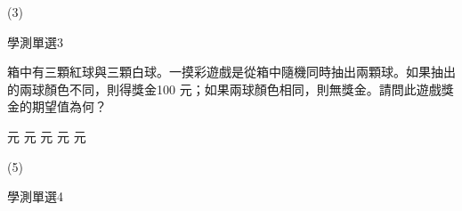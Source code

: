 \begin{QUESTIONS}
\begin{QUESTION}
        \begin{QFROMS}
        \end{QFROMS}
        \begin{QTAGS}\end{QTAGS}
        \begin{QANS}
            (3)
        \end{QANS}
        \begin{QSOLLIST}
        \end{QSOLLIST}
        \begin{QEMPTYSPACE}
        \end{QEMPTYSPACE}
    \end{QUESTION}
    \begin{QUESTION}
        \begin{ExamInfo}{99}{學測}{單選}{3}
        \end{ExamInfo}
        \begin{ExamAnsRateInfo}{55}{84}{62}{19}
        \end{ExamAnsRateInfo}
        \begin{QBODY}
            箱中有三顆紅球與三顆白球。一摸彩遊戲是從箱中隨機同時抽出兩顆球。如果抽出的兩球顏色不同，則得獎金100 元；如果兩球顏色相同，則無獎金。請問此遊戲獎金的期望值為何？
			\begin{QOPS} 
				 元 
				 元 
				 元 
				 元 
				 元
			\end{QOPS}
        \end{QBODY}
        \begin{QFROMS}
        \end{QFROMS}
        \begin{QTAGS}\end{QTAGS}
        \begin{QANS}
            (5)
        \end{QANS}
        \begin{QSOLLIST}
        \end{QSOLLIST}
        \begin{QEMPTYSPACE}
        \end{QEMPTYSPACE}
    \end{QUESTION}
    \begin{QUESTION}
        \begin{ExamInfo}{99}{學測}{單選}{4}
        \end{ExamInfo}
        \begin{ExamAnsRateInfo}{33}{61}{25}{13}

\end{ExamAnsRateInfo}
\end{QUESTION}
\end{QUESTIONS}
